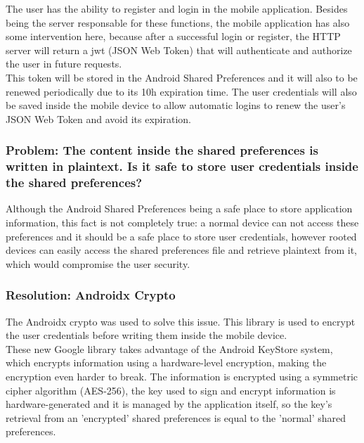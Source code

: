 The user has the ability to register and login in the mobile application. Besides being the server responsable for these functions, the mobile application has also some intervention
here, because after a successful login or register, the HTTP server will return a jwt (JSON Web Token) that will authenticate and authorize the user in future requests.\\

This token will be stored in the Android Shared Preferences\cite{sharedpreferences} and it will also to be renewed periodically due to its 10h expiration time. The user credentials will also be saved
inside the mobile device to allow automatic logins to renew the user's JSON Web Token and avoid its expiration.\\

\subsubsection{Problem: The content inside the shared preferences is written in plaintext. Is it safe to store user credentials inside the shared preferences?}

Although the Android Shared Preferences being a safe place to store application information, this fact is not completely true:
a normal device can not access these preferences and it should be a safe place to store user credentials, however rooted devices\cite{root} can easily
access the shared preferences file and retrieve plaintext from it, which would compromise the user security.\\

\subsubsection{Resolution: Androidx Crypto}

The Androidx crypto\cite{crypto} was used to solve this issue. This library is used to encrypt the user credentials before writing them inside the mobile device.\\

These new Google library takes advantage of the Android KeyStore\cite{keystore} system, which encrypts information using a hardware-level encryption, making the
encryption even harder to break. The information is encrypted using a symmetric cipher algorithm (AES-256), the key used to sign and encrypt information
is hardware-generated and it is managed by the application itself, so the key's retrieval from an 'encrypted' shared preferences is equal to the 'normal'
shared preferences.\\

